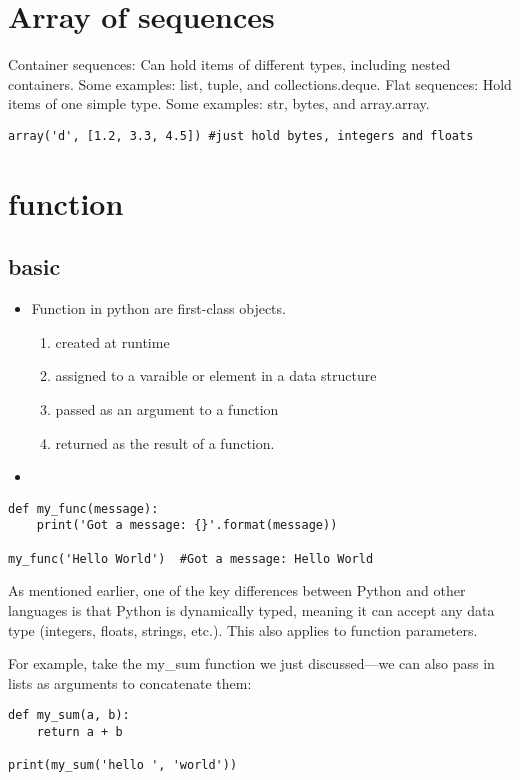 \documentclass[a4paper,12pt,twoside]{book}
\begin{document}
\chapter{Array of sequences}
Container sequences: Can hold items of different types, including nested containers. Some examples:
list, tuple, and collections.deque.
Flat sequences: Hold items of one simple type. Some examples: str, bytes, and array.array.

\begin{lstlisting}
array('d', [1.2, 3.3, 4.5]) #just hold bytes, integers and floats
\end{lstlisting}

\chapter{function}
\section{basic}
\begin{itemize}
	\item Function in python are first-class objects.
	\begin{enumerate}
		\item created at runtime
		\item assigned to a varaible or element in a data structure
		\item passed as an argument to a function
		\item returned as the result of a function.
	\end{enumerate}
	\item 
\end{itemize}
\begin{lstlisting}
def my_func(message):
	print('Got a message: {}'.format(message))

my_func('Hello World')  #Got a message: Hello World
\end{lstlisting}

As mentioned earlier, one of the key differences between Python and other languages is that Python is dynamically typed, meaning it can accept any data type (integers, floats, strings, etc.). This also applies to function parameters.

For example, take the my\_sum function we just discussed—we can also pass in lists as arguments to concatenate them:
\begin{lstlisting}
def my_sum(a, b): 
	return a + b	
	
print(my_sum('hello ', 'world'))
\end{lstlisting}
\end{document}
